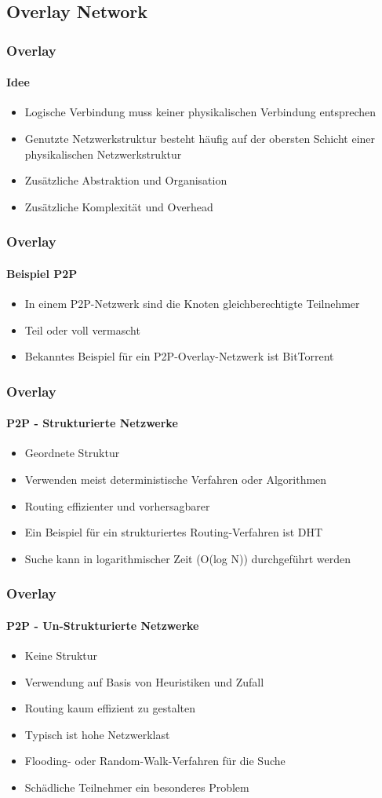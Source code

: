 \subsection{Overlay Network}
\begin{frame}
  \frametitle{Overlay}
  \framesubtitle{Idee}
  \begin{itemize}
    \item Logische Verbindung muss keiner physikalischen Verbindung entsprechen
    \item Genutzte Netzwerkstruktur besteht häufig auf der obersten Schicht einer physikalischen Netzwerkstruktur
    \item Zusätzliche Abstraktion und Organisation
    \item Zusätzliche Komplexität und Overhead
  \end{itemize}
\end{frame}

\begin{frame}
  \frametitle{Overlay}
  \framesubtitle{Beispiel P2P}
  \begin{itemize}
    \item In einem P2P-Netzwerk sind die Knoten gleichberechtigte Teilnehmer
    \item Teil oder voll vermascht 
    \item Bekanntes Beispiel für ein P2P-Overlay-Netzwerk ist BitTorrent
  \end{itemize}
\end{frame}

\begin{frame}
  \frametitle{Overlay}
  \framesubtitle{P2P - Strukturierte Netzwerke}
  \begin{itemize}
    \item Geordnete Struktur
    \item Verwenden meist deterministische Verfahren oder Algorithmen
    \item Routing effizienter und vorhersagbarer 
    \item Ein Beispiel für ein strukturiertes Routing-Verfahren ist DHT
    \item Suche kann in logarithmischer Zeit (O(log N)) durchgeführt werden
  \end{itemize}
\end{frame}

\begin{frame}
  \frametitle{Overlay}
  \framesubtitle{P2P - Un-Strukturierte Netzwerke}
  \begin{itemize}
    \item Keine Struktur
    \item Verwendung auf Basis von Heuristiken und Zufall
    \item Routing kaum effizient zu gestalten 
    \item Typisch ist hohe Netzwerklast
    \item Flooding- oder Random-Walk-Verfahren für die Suche
    \item Schädliche Teilnehmer ein besonderes Problem
  \end{itemize}
\end{frame}